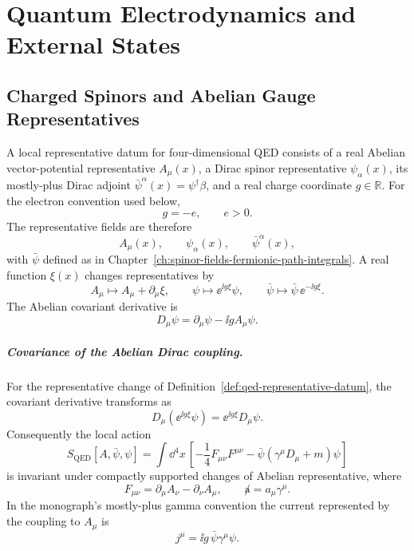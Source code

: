 \chapter{Quantum Electrodynamics and External States}
\label{ch:qed-external-states}
\ConventionsLorentzian


\section{Charged Spinors and Abelian Gauge Representatives}

\begin{definition}
\label{def:qed-representative-datum}
A local representative datum for four-dimensional QED consists of a real
Abelian vector-potential representative \(A_\mu(x)\), a Dirac spinor
representative \(\psi_\alpha(x)\), its mostly-plus Dirac adjoint
\(\bar\psi^\alpha(x)=\psi^\dagger\beta\), and a real charge coordinate
\(g\in\mathbb R\).  For the electron convention used below,
\[
  g=-e,\qquad e>0 .
\]
The representative fields are therefore
\[
  A_\mu(x),\qquad \psi_\alpha(x),\qquad \bar\psi^\alpha(x),
\]
with \(\bar\psi\) defined as in
Chapter~\ref{ch:spinor-fields-fermionic-path-integrals}.  A real function
\(\xi(x)\) changes representatives by
\[
  A_\mu\mapsto A_\mu+\partial_\mu\xi,\qquad
  \psi\mapsto \ee^{\ii g\xi}\psi,\qquad
  \bar\psi\mapsto \bar\psi\,\ee^{-\ii g\xi}.
\]
The Abelian covariant derivative is
\[
  D_\mu\psi
  =
  \partial_\mu\psi-\ii gA_\mu\psi .
\]
\end{definition}

\paragraph{Covariance of the Abelian Dirac coupling.}
For the representative change of
Definition~\ref{def:qed-representative-datum}, the covariant derivative
transforms as
\[
  D_\mu(\ee^{\ii g\xi}\psi)=\ee^{\ii g\xi}D_\mu\psi .
\]
Consequently the local action
\[
  S_{\mathrm{QED}}[A,\bar\psi,\psi]
  =
  \int\dd^4x\,
  \left[
    -\frac14F_{\mu\nu}F^{\mu\nu}
    -\bar\psi(\gamma^\mu D_\mu+m)\psi
  \right]
\]
is invariant under compactly supported changes of Abelian representative,
where
\[
  F_{\mu\nu}=\partial_\mu A_\nu-\partial_\nu A_\mu,\qquad
  \not a=a_\mu\gamma^\mu .
\]
In the monograph's mostly-plus gamma convention the current represented by
the coupling to \(A_\mu\) is
\[
  j^\mu=\ii g\,\bar\psi\gamma^\mu\psi .
\]

